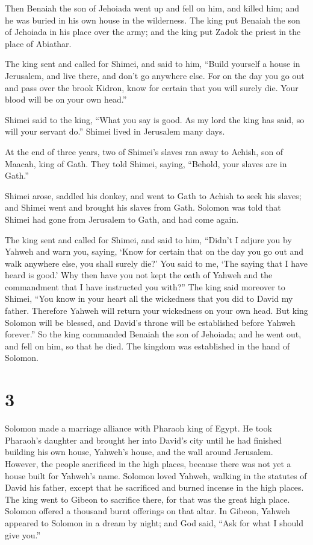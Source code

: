  Then Benaiah the son of Jehoiada went up and fell on
him, and killed him; and he was buried in his own house in the
wilderness.  The king put Benaiah the son of Jehoiada in
his place over the army; and the king put Zadok the priest in the place
of Abiathar.

 The king sent and called for Shimei, and said to him,
``Build yourself a house in Jerusalem, and live there, and don't go
anywhere else.  For on the day you go out and pass over
the brook Kidron, know for certain that you will surely die. Your blood
will be on your own head.''

 Shimei said to the king, ``What you say is good. As my
lord the king has said, so will your servant do.'' Shimei lived in
Jerusalem many days.

 At the end of three years, two of Shimei's slaves ran
away to Achish, son of Maacah, king of Gath. They told Shimei, saying,
``Behold, your slaves are in Gath.''

 Shimei arose, saddled his donkey, and went to Gath to
Achish to seek his slaves; and Shimei went and brought his slaves from
Gath.  Solomon was told that Shimei had gone from
Jerusalem to Gath, and had come again.

 The king sent and called for Shimei, and said to him,
``Didn't I adjure you by Yahweh and warn you, saying, `Know for certain
that on the day you go out and walk anywhere else, you shall surely
die?' You said to me, `The saying that I have heard is good.'
 Why then have you not kept the oath of Yahweh and the
commandment that I have instructed you with?''  The king
said moreover to Shimei, ``You know in your heart all the wickedness
that you did to David my father. Therefore Yahweh will return your
wickedness on your own head.  But king Solomon will be
blessed, and David's throne will be established before Yahweh forever.''
 So the king commanded Benaiah the son of Jehoiada; and
he went out, and fell on him, so that he died. The kingdom was
established in the hand of Solomon.

\hypertarget{section-2}{%
\section{3}\label{section-2}}

 Solomon made a marriage alliance with Pharaoh king of
Egypt. He took Pharaoh's daughter and brought her into David's city
until he had finished building his own house, Yahweh's house, and the
wall around Jerusalem.  However, the people sacrificed in
the high places, because there was not yet a house built for Yahweh's
name.  Solomon loved Yahweh, walking in the statutes of
David his father, except that he sacrificed and burned incense in the
high places.  The king went to Gibeon to sacrifice there,
for that was the great high place. Solomon offered a thousand burnt
offerings on that altar.  In Gibeon, Yahweh appeared to
Solomon in a dream by night; and God said, ``Ask for what I should give
you.''

